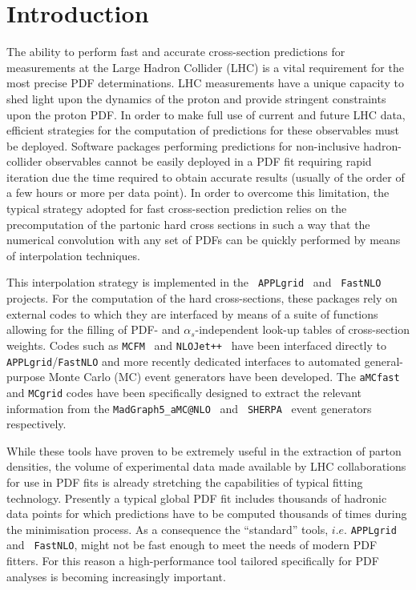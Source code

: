 \documentclass[preprint,12pt]{elsarticle}
\begin{document}
\clearpage

\tableofcontents

\section{Introduction}\label{sec:intro}

The ability to perform fast and accurate cross-section predictions for measurements at
the Large Hadron Collider (LHC) is a vital requirement for the most precise PDF determinations. LHC measurements have a unique
capacity to shed light upon the dynamics of the proton and provide stringent constraints upon 
the proton PDF. In order to make full use of current and future LHC data, efficient strategies
for the computation of predictions for these observables must be deployed. Software packages performing predictions 
for non-inclusive hadron-collider observables cannot be easily deployed in a PDF fit requiring rapid iteration due the time required to obtain accurate results (usually of the order of a few hours or more
per data point). In order to overcome this limitation, the typical strategy adopted for fast cross-section prediction relies on the precomputation
of the partonic hard cross sections in such a way that the numerical convolution with any set of PDFs can be quickly performed by means of interpolation techniques.

This interpolation strategy is implemented in the {\tt
  APPLgrid}~\cite{Carli:2010rw} and {\tt
  FastNLO}~\cite{Wobisch:2011ij} projects. For the computation of the hard
cross-sections, these packages rely on external codes to which they
are interfaced by means of a suite of
functions allowing for the filling of PDF- and
$\alpha_s$-independent look-up tables of cross-section weights. Codes
such as {\tt MCFM}~\cite{Campbell:2010ff} and {\tt NLOJet++}~\cite{Nagy:2003tz} have been interfaced directly to 
 {\tt APPLgrid}/{\tt FastNLO} and more recently dedicated interfaces to
automated general-purpose Monte Carlo (MC) event generators have been
developed. The {\tt aMCfast} and {\tt MCgrid} codes
have been specifically designed to extract the relevant information
from the {\tt MadGraph5\_aMC@NLO}~\cite{Alwall:2014hca} and {\tt
  SHERPA}~\cite{Gleisberg:2008ta} event generators respectively.

While these tools have proven to be extremely useful in the
extraction of parton densities, the volume of experimental data
made available by LHC collaborations for use in PDF fits is already
stretching the capabilities of typical fitting technology. Presently a typical global PDF fit includes
thousands of hadronic data points for which predictions have to be
computed thousands of times during the minimisation process. As a
consequence the ``standard'' tools, $i.e.$ {\tt APPLgrid} and {\tt
  FastNLO}, might not be fast enough to meet the needs of modern
PDF fitters. For this reason a high-performance tool tailored specifically 
for PDF analyses is becoming increasingly important.
\end{document}
